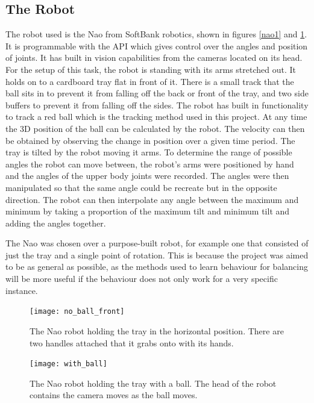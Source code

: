 \documentclass[12pt,a4paper]{article}
\begin{document}
\subsection{The Robot}
The robot used is the Nao from SoftBank robotics, shown in figures \ref{nao1} and \ref{nao2}. It is programmable with the API which gives control over the angles and position of joints. It has built in vision capabilities from the cameras located on its head. For the setup of this task, the robot is standing with its arms stretched out. It holds on to a cardboard tray flat in front of it. There is a small track that the ball sits in to prevent it from falling off the back or front of the tray, and two side buffers to prevent it from falling off the sides. The robot has built in functionality to track a red ball which is the tracking method used in this project. At any time the 3D position of the ball can be calculated by the robot. The velocity can then be obtained by observing the change in position over a given time period. The tray is tilted by the robot moving it arms. To determine the range of possible angles the robot can move between, the robot's arms were positioned by hand and the angles of the upper body joints were recorded. The angles were then manipulated so that the same angle could be recreate but in the opposite direction. The robot can then interpolate any angle between the maximum and minimum by taking a proportion of the maximum tilt and minimum tilt and adding the angles together.

The Nao was chosen over a purpose-built robot, for example one that consisted of just the tray and a single point of rotation. This is because the project was aimed to be as general as possible, as the methods used to learn behaviour for balancing will be more useful if the behaviour does not only work for a very specific instance. 


\begin{figure}[H]
\centering
\begin{minipage}[t]{.45\textwidth}
  \centering
  \texttt{[image: no\_ball\_front]}
  \caption{The Nao robot holding the tray in the horizontal position. There are two handles attached that it grabs onto with its hands.}
  \label{nao1}
\end{minipage}\quad
\begin{minipage}[t]{.45\textwidth}
  \centering
  \texttt{[image: with\_ball]}
  \caption{The Nao robot holding the tray with a ball. The head of the robot contains the camera moves as the ball moves.}
  \label{nao2}
\end{minipage}
\end{figure}
\end{document}
